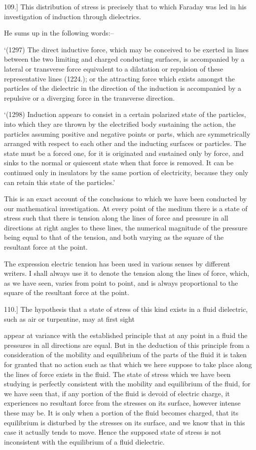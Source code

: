 \documentclass[11pt,a4paper]{article}
\begin{document}
109.] This distribution of stress is precisely that to which Faraday was led in his investigation of induction through dielectrics.

He sums up in the following words:--

`(1297) The direct inductive force, which may be conceived to be exerted in lines between the two limiting and charged conducting surfaces, is accompanied by a lateral or transverse force equivalent to a dilatation or repulsion of these representative lines (1224.); or the attracting force which exists amongst the particles of the dielectric in the direction of the induction is accompanied by a repulsive or a diverging force in the transverse direction.

`(1298) Induction appears to consist in a certain polarized state of the particles, into which they are thrown by the electrified body sustaining the action, the particles assuming positive and negative points or parts, which are symmetrically arranged with respect to each other and the inducting surfaces or particles. The state must be a forced one, for it is originated and sustained only by force, and sinks to the normal or quiescent state when that force is removed. It can be continued only in insulators by the same portion of electricity, because they only can retain this state of the particles.'

This is an exact account of the conclusions to which we have been conducted by our mathematical investigation. At every point of the medium there is a state of stress such that there is tension along the lines of force and pressure in all directions at right angles to these lines, the numerical magnitude of the pressure being equal to that of the tension, and both varying as the square of the resultant force at the point.

The expression electric tension has been used in various senses by different writers. I shall always use it to denote the tension along the lines of force, which, as we have seen, varies from point to point, and is always proportional to the square of the resultant force at the point.

110.] The hypothesis that a state of stress of this kind exists in a fluid dielectric, such as air or turpentine, may at first sight

appear at variance with the established principle that at any point in a fluid the pressures in all directions are equal. But in the deduction of this principle from a consideration of the mobility and equilibrium of the parts of the fluid it is taken for granted that no action such as that which we here suppose to take place along the lines of force exists in the fluid. The state of stress which we have been studying is perfectly consistent with the mobility and equilibrium of the fluid, for we have seen that, if any portion of the fluid is devoid of electric charge, it experiences no resultant force from the stresses on its surface, however intense these may be. It is only when a portion of the fluid becomes charged, that its equilibrium is disturbed by the stresses on its surface, and we know that in this case it actually tends to move. Hence the supposed state of stress is not inconsistent with the equilibrium of a fluid dielectric.
\end{document}
